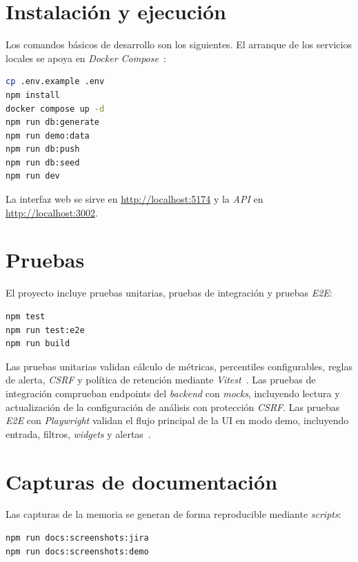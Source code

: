 \begin{refsection}
\section{Instalación y ejecución}

Los comandos básicos de desarrollo son los siguientes. El arranque de los servicios locales se apoya en \textit{Docker Compose}~\cite{DockerComposeDocs}:

\begin{lstlisting}[language=bash]
cp .env.example .env
npm install
docker compose up -d
npm run db:generate
npm run demo:data
npm run db:push
npm run db:seed
npm run dev
\end{lstlisting}

La interfaz web se sirve en \url{http://localhost:5174} y la \textit{API} en \url{http://localhost:3002}.

\section{Pruebas}

El proyecto incluye pruebas unitarias, pruebas de integración y pruebas \textit{E2E}:

\begin{lstlisting}[language=bash]
npm test
npm run test:e2e
npm run build
\end{lstlisting}

Las pruebas unitarias validan cálculo de métricas, percentiles configurables, reglas de alerta, \textit{CSRF} y política de retención mediante \textit{Vitest}~\cite{VitestGuide}. Las pruebas de integración comprueban endpoints del \textit{backend} con \textit{mocks}, incluyendo lectura y actualización de la configuración de análisis con protección \textit{CSRF}. Las pruebas \textit{E2E} con \textit{Playwright} validan el flujo principal de la UI en modo demo, incluyendo entrada, filtros, \textit{widgets} y alertas~\cite{PlaywrightDocs}.

\section{Capturas de documentación}

Las capturas de la memoria se generan de forma reproducible mediante \textit{scripts}:

\begin{lstlisting}[language=bash]
npm run docs:screenshots:jira
npm run docs:screenshots:demo
\end{lstlisting}


\end{refsection}
